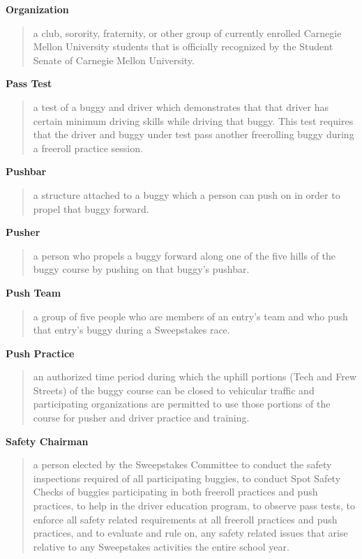 \textbf{Organization}
\begin{quote}
	a club, sorority, fraternity, or other group of currently enrolled Carnegie Mellon University students that is officially recognized by the Student Senate of Carnegie Mellon University.
\end{quote}

\textbf{Pass Test}
\begin{quote}
	a test of a buggy and driver which demonstrates that that driver has certain minimum driving skills while driving that buggy. This test requires that the driver and buggy under test pass another freerolling buggy during a freeroll practice session.
\end{quote}

\textbf{Pushbar}
\begin{quote}
	a structure attached to a buggy which a person can push on in order to propel that buggy forward.
\end{quote}

\textbf{Pusher}
\begin{quote}
	a person who propels a buggy forward along one of the five hills of the buggy course by pushing on that buggy's pushbar.
\end{quote}

\textbf{Push Team}
\begin{quote}
	a group of five people who are members of an entry's team and who push that entry's buggy during a Sweepstakes race.
\end{quote}

\textbf{Push Practice}
\begin{quote}
	an authorized time period during which the uphill portions (Tech and Frew Streets) of the buggy course can be closed to vehicular traffic and participating organizations are permitted to use those portions of the course for pusher and driver practice and training.
\end{quote}

\textbf{Safety Chairman}
\begin{quote}
	a person elected by the Sweepstakes Committee to conduct the safety inspections required of all participating buggies, to conduct Spot Safety Checks of buggies participating in both freeroll practices and push practices, to help in the driver education program, to observe pass tests, to enforce all safety related requirements at all freeroll practices and push practices, and to evaluate and rule on, any safety related issues that arise relative to any Sweepstakes activities the entire school year.
\end{quote}

